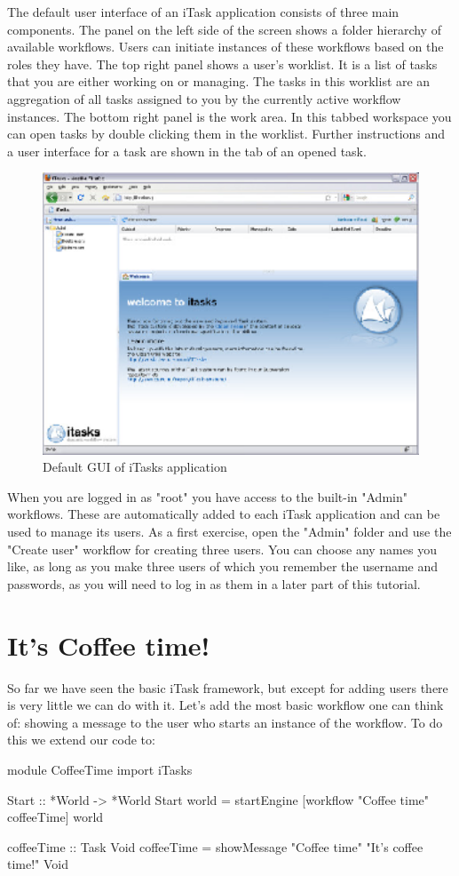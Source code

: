 \documentclass[a4paper,11pt]{article}
\begin{document}
The default user interface of an iTask application consists of three main components. The panel on the left side of the screen shows a folder hierarchy of available workflows. Users can initiate instances of these workflows based on the roles they have. The top right panel shows a user's worklist. It is a list of tasks that you are either working on or managing. The tasks in this worklist are an aggregation of all tasks assigned to you by the currently active workflow instances. The bottom right panel is the work area. In this tabbed workspace you can open tasks by double clicking them in the worklist. Further instructions and a user interface for a task are shown in the tab of an opened task.
\begin{figure}[h]
\centerline{\includegraphics[width=12cm]{GettingStarted-img/empty-browser.eps}}
\caption{Default GUI of iTasks application} \label{empty-browser}
\end{figure}

When you are logged in as "root" you have access to the built-in "Admin" workflows. These are automatically added to each iTask application and can be used to manage its users. As a first exercise, open the "Admin" folder and use the "Create user" workflow for creating three users. You can choose any names you like, as long as you make three users of which you remember the username and passwords, as you will need to log in as them in a later part of this tutorial.

\section{It's Coffee time!}
So far we have seen the basic iTask framework, but except for adding users there is very little we can do with it. Let's add the most basic workflow one can think of: showing a message to the user who starts an instance of the workflow.
To do this we extend our code to:
\begin{CleanCode}
module CoffeeTime
import iTasks

Start :: *World -> *World
Start world = startEngine [workflow "Coffee time" coffeeTime] world

coffeeTime :: Task Void
coffeeTime = showMessage "Coffee time" "It's coffee time!" Void
\end{CleanCode}
\end{document}
